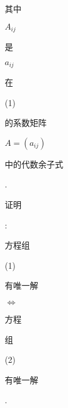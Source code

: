 \documentclass[10pt]{article}
\begin{document}
\begin{CJK}{UTF8}{mj}其中\end{CJK} $A_{i j}$ \begin{CJK}{UTF8}{mj}是\end{CJK} $a_{i j}$ \begin{CJK}{UTF8}{mj}在\end{CJK} (1) \begin{CJK}{UTF8}{mj}的系数矩阵\end{CJK} $A=\left(a_{i j}\right)$ \begin{CJK}{UTF8}{mj}中的代数余子式\end{CJK}. \begin{CJK}{UTF8}{mj}证明\end{CJK}: \begin{CJK}{UTF8}{mj}方程组\end{CJK} (1) \begin{CJK}{UTF8}{mj}有唯一解\end{CJK} $\Leftrightarrow$ \begin{CJK}{UTF8}{mj}方程\end{CJK} \begin{CJK}{UTF8}{mj}组\end{CJK} (2) \begin{CJK}{UTF8}{mj}有唯一解\end{CJK}.
\end{document}
